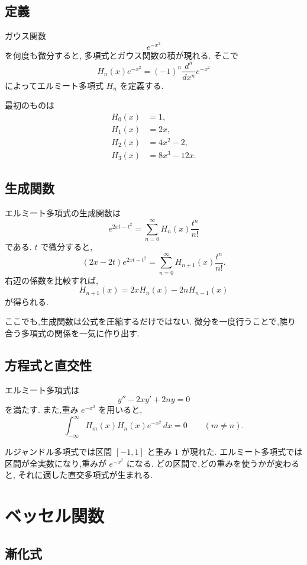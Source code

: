 \subsection{定義}

ガウス関数
\[
  e^{-x^2}
\]
を何度も微分すると,
多項式とガウス関数の積が現れる.
そこで
\[
  H_n(x)e^{-x^2}
  =(-1)^n\frac{d^n}{dx^n}e^{-x^2}
\]
によってエルミート多項式 $H_n$ を定義する.

最初のものは
\[
\begin{align*}
  H_0(x)&=1,\\
  H_1(x)&=2x,\\
  H_2(x)&=4x^2-2,\\
  H_3(x)&=8x^3-12x.
\end{align*}
\]

\subsection{生成関数}

エルミート多項式の生成関数は
\[
  e^{2xt-t^2}
  =\sum_{n=0}^{\infty}H_n(x)\frac{t^n}{n!}
\]
である.
$t$ で微分すると,
\[
  (2x-2t)e^{2xt-t^2}
  =\sum_{n=0}^{\infty}H_{n+1}(x)\frac{t^n}{n!}.
\]
右辺の係数を比較すれば,
\[
  H_{n+1}(x)=2xH_n(x)-2nH_{n-1}(x)
\]
が得られる.

ここでも,生成関数は公式を圧縮するだけではない.
微分を一度行うことで,隣り合う多項式の関係を一気に作り出す.

\subsection{方程式と直交性}

エルミート多項式は
\[
  y''-2xy'+2ny=0
\]
を満たす.
また,重み $e^{-x^2}$ を用いると,
\[
  \int_{-\infty}^{\infty}
  H_m(x)H_n(x)e^{-x^2}\,dx=0
  \qquad(m\neq n).
\]

ルジャンドル多項式では区間 $[-1,1]$ と重み $1$ が現れた.
エルミート多項式では区間が全実数になり,重みが $e^{-x^2}$ になる.
どの区間で,どの重みを使うかが変わると,
それに適した直交多項式が生まれる.

\section{ベッセル関数}

\subsection{漸化式}

